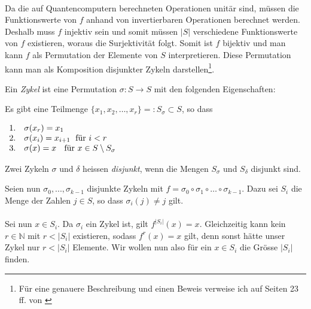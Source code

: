 \paragraph{}
Da die auf Quantencomputern berechneten Operationen unitär sind, müssen die Funktionswerte von $f$ anhand von invertierbaren Operationen berechnet werden. Deshalb muss $f$ injektiv sein und somit müssen $|S|$ verschiedene Funktionswerte von $f$ existieren, woraus die Surjektivität folgt. Somit ist $f$ bijektiv und man kann $f$ als Permutation der Elemente von $S$ interpretieren. Diese Permutation kann man als Komposition disjunkter Zykeln darstellen\footnote{Für eine genauere Beschreibung und einen Beweis verweise ich auf Seiten 23 ff. von \cite{perm}}.

\vspace{0.1cm}
\hspace{0.8cm}\begin{minipage}[t]{13.3cm}

Ein \emph{Zykel} ist eine Permutation $\sigma : S\rightarrow S$ mit den folgenden Eigenschaften:

\vspace{0.1cm}
Es gibt eine Teilmenge $\{x_1, x_2, \ldots, x_r\}=:S_\sigma \subset S $, so dass

\vspace{0.1cm}
$\begin{array}{ll}

1. & \sigma (x_r)=x_1 \\

2. & \sigma (x_i)=x_{i+1} \text{ \;für $i<r$}  \\

3. & \sigma (x)=x \text{ \; für $x\in S\setminus S_\sigma$}

\end{array}$

\vspace{0.1cm}
Zwei Zykeln $\sigma$ und $\delta$ heissen \emph{disjunkt}, wenn die Mengen $S_\sigma$ und $S_\delta$ disjunkt sind.

\end{minipage}


\vspace{0.2cm}
Seien nun $\sigma_0, ..., \sigma_{k - 1}$ disjunkte Zykeln mit $f=\sigma_0\circ\sigma_1\circ \ldots\circ \sigma_{k - 1}$. Dazu sei $S_i$ die Menge der Zahlen $j \in S$, so dass $\sigma_i(j) \neq j$ gilt.
\paragraph{}
Sei nun $x \in S_i$. Da $\sigma_i$ ein Zykel ist, gilt $f^{|S_i|}(x) = x$. Gleichzeitig kann kein $r \in \mathbb{N}$ mit $r < |S_i|$ existieren, sodass $f^r(x) = x$ gilt, denn sonst hätte unser Zykel nur $r < |S_i|$ Elemente. Wir wollen nun also für ein $x \in S_i$ die Grösse $|S_i|$ finden.

